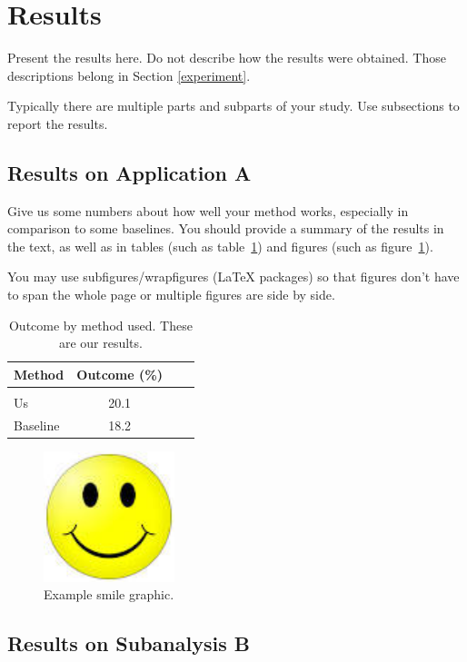 \documentclass[twoside,11pt]{article}
\begin{document}
\section{Results} \label{results}

Present the results here.
Do not describe how the results were obtained.
Those descriptions belong in Section \ref{experiment}.

Typically there are multiple parts and subparts of your study.
Use subsections to report the results.

\subsection{Results on Application A} 

Give us some numbers about how well your method works, especially in comparison to some baselines.
You should provide a summary of the results in the text, as well as in tables (such as table~\ref{tab:example}) and figures (such as figure~\ref{fig:example}).  

You may use subfigures/wrapfigures (LaTeX packages) so that figures don't have to span the whole page or multiple figures are side by side.

\begin{table}[htbp]
  \centering 
  \begin{tabular}{lclc} 
    Method & Outcome (\%) \\ 
    \hline \\[-11pt]
    Us & 20.1 \\ 
    Baseline & 18.2 \\ \hline 
  \end{tabular}
  \label{tab:example} 
    \caption{Outcome by method used. These are our results.} 
\end{table}

\begin{figure}[htbp]
  \centering 
  \includegraphics[width=1.5in]{smile.jpeg} 
  \caption{Example smile graphic.}
  \label{fig:example} 
\end{figure} 

\subsection{Results on Subanalysis B} 
\end{document}
